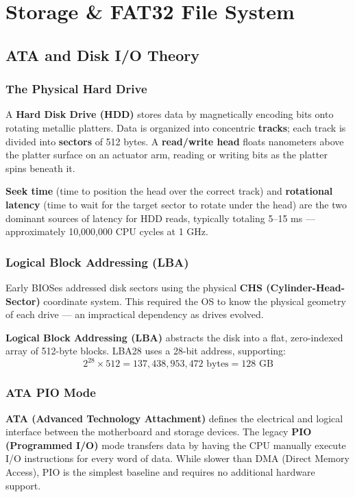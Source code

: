 \documentclass[12pt,a4paper]{report}
\begin{document}
\newpage

\chapter{Storage \& FAT32 File System}

\section{ATA and Disk I/O Theory}

\subsection{The Physical Hard Drive}

A \textbf{Hard Disk Drive (HDD)} stores data by magnetically encoding bits onto
rotating metallic platters. Data is organized into concentric \textbf{tracks}; each
track is divided into \textbf{sectors} of 512 bytes. A \textbf{read/write head}
floats nanometers above the platter surface on an actuator arm, reading or writing
bits as the platter spins beneath it.

\textbf{Seek time} (time to position the head over the correct track) and
\textbf{rotational latency} (time to wait for the target sector to rotate under the
head) are the two dominant sources of latency for HDD reads, typically totaling
5--15 ms --- approximately 10,000,000 CPU cycles at 1 GHz.

\subsection{Logical Block Addressing (LBA)}

Early BIOSes addressed disk sectors using the physical \textbf{CHS (Cylinder-Head-Sector)}
coordinate system. This required the OS to know the physical geometry of each drive ---
an impractical dependency as drives evolved.

\textbf{Logical Block Addressing (LBA)} abstracts the disk into a flat, zero-indexed
array of 512-byte blocks. LBA28 uses a 28-bit address, supporting:
\[
2^{28} \times 512 = 137{,}438{,}953{,}472 \text{ bytes} = 128 \text{ GB}
\]

\subsection{ATA PIO Mode}

\textbf{ATA (Advanced Technology Attachment)} defines the electrical and logical
interface between the motherboard and storage devices. The legacy \textbf{PIO
(Programmed I/O)} mode transfers data by having the CPU manually execute I/O
instructions for every word of data. While slower than DMA (Direct Memory Access),
PIO is the simplest baseline and requires no additional hardware support.
\end{document}
